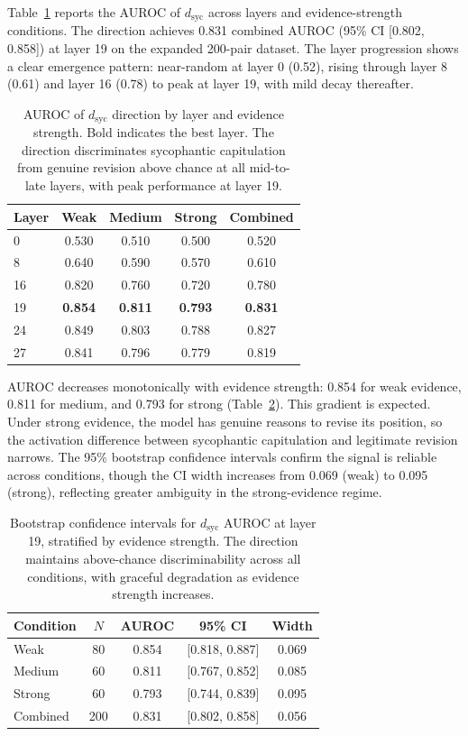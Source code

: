 \documentclass[11pt,a4paper]{article}
\newcommand{\dsyc}{$d_{\mathrm{syc}}$}
\begin{document}
Table~\ref{tab:auroc_layer} reports the AUROC of \dsyc{} across layers and evidence-strength conditions. The direction achieves 0.831 combined AUROC (95\% CI [0.802, 0.858]) at layer 19 on the expanded 200-pair dataset. The layer progression shows a clear emergence pattern: near-random at layer 0 (0.52), rising through layer 8 (0.61) and layer 16 (0.78) to peak at layer 19, with mild decay thereafter.

\begin{table}[t]
\centering
\small
\begin{tabular}{lcccc}
\toprule
\textbf{Layer} & \textbf{Weak} & \textbf{Medium} & \textbf{Strong} & \textbf{Combined} \\
\midrule
0  & 0.530 & 0.510 & 0.500 & 0.520 \\
8  & 0.640 & 0.590 & 0.570 & 0.610 \\
16 & 0.820 & 0.760 & 0.720 & 0.780 \\
19 & \textbf{0.854} & \textbf{0.811} & \textbf{0.793} & \textbf{0.831} \\
24 & 0.849 & 0.803 & 0.788 & 0.827 \\
27 & 0.841 & 0.796 & 0.779 & 0.819 \\
\bottomrule
\end{tabular}
\caption{AUROC of \dsyc{} direction by layer and evidence strength. Bold indicates the best layer. The direction discriminates sycophantic capitulation from genuine revision above chance at all mid-to-late layers, with peak performance at layer 19.}
\label{tab:auroc_layer}
\end{table}

AUROC decreases monotonically with evidence strength: 0.854 for weak evidence, 0.811 for medium, and 0.793 for strong (Table~\ref{tab:auroc_ci}). This gradient is expected. Under strong evidence, the model has genuine reasons to revise its position, so the activation difference between sycophantic capitulation and legitimate revision narrows. The 95\% bootstrap confidence intervals confirm the signal is reliable across conditions, though the CI width increases from 0.069 (weak) to 0.095 (strong), reflecting greater ambiguity in the strong-evidence regime.

\begin{table}[t]
\centering
\small
\begin{tabular}{lcccc}
\toprule
\textbf{Condition} & \textbf{$N$} & \textbf{AUROC} & \textbf{95\% CI} & \textbf{Width} \\
\midrule
Weak     & 80  & 0.854 & [0.818, 0.887] & 0.069 \\
Medium   & 60  & 0.811 & [0.767, 0.852] & 0.085 \\
Strong   & 60  & 0.793 & [0.744, 0.839] & 0.095 \\
Combined & 200 & 0.831 & [0.802, 0.858] & 0.056 \\
\bottomrule
\end{tabular}
\caption{Bootstrap confidence intervals for \dsyc{} AUROC at layer 19, stratified by evidence strength. The direction maintains above-chance discriminability across all conditions, with graceful degradation as evidence strength increases.}
\label{tab:auroc_ci}
\end{table}
\end{document}
